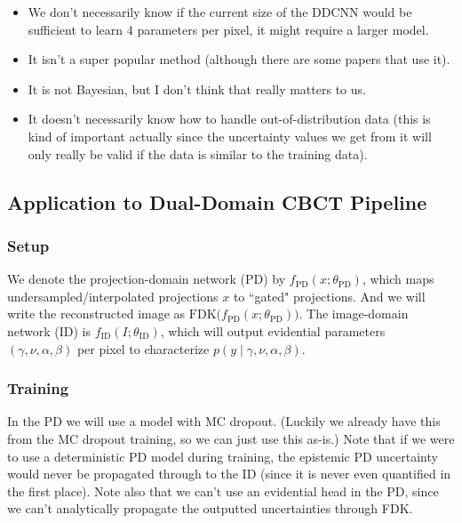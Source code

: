 \documentclass{article}
\newcommand{\0}{\varnothing}
\theoremstyle{definition}
\begin{document}
\begin{itemize}
  \item We don't necessarily know if the current size of the DDCNN would be sufficient to learn 4 parameters per pixel, it might require a larger model.
  \item It isn't a super popular method (although there are some papers that use it).
  \item It is not Bayesian, but I don't think that really matters to us.
  \item It doesn't necessarily know how to handle out-of-distribution data (this is kind of important actually since the uncertainty values we get from it will only really be valid if the data is similar to the training data).
\end{itemize}

\subsection{Application to Dual-Domain CBCT Pipeline}


\subsubsection{Setup}
We denote the projection-domain network (PD) by $f_\text{PD}(x; \theta_\text{PD})$, which maps undersampled/interpolated projections $x$ to ``gated" projections. And we will write the reconstructed image as $\mathrm{FDK}\big(f_\text{PD}(x;\theta_\text{PD})\big)$. The image-domain network (ID) is $f_\text{ID}(I; \theta_\text{ID})$, which will output evidential parameters $(\gamma,\nu,\alpha,\beta)$ per pixel to characterize $p(y \mid \gamma,\nu,\alpha,\beta)$.

\subsubsection{Training}
In the PD we will use a model with MC dropout. (Luckily we already have this from the MC dropout training, so we can just use this as-is.) Note that if we were to use a deterministic PD model during training, the epistemic PD uncertainty would never be propagated through to the ID (since it is never even quantified in the first place). Note also that we can't use an evidential head in the PD,  since we can't analytically propagate the outputted uncertainties through FDK.
\end{document}
